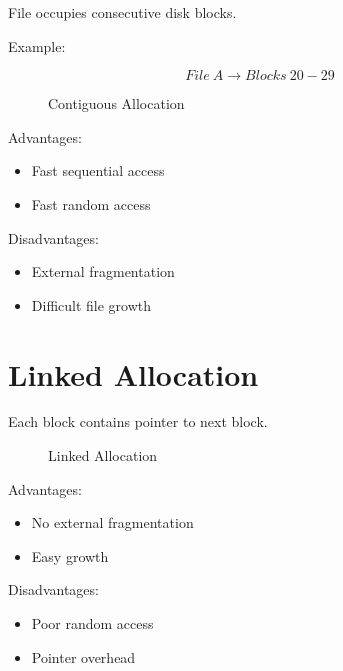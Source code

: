 File occupies consecutive disk blocks.

Example:

\[
File\ A \rightarrow Blocks\ 20-29
\]

\begin{figure}[H]
\centering
{}
\caption{Contiguous Allocation}
\end{figure}

Advantages:

\begin{itemize}
\item Fast sequential access
\item Fast random access
\end{itemize}

Disadvantages:

\begin{itemize}
\item External fragmentation
\item Difficult file growth
\end{itemize}

\section{Linked Allocation}

Each block contains pointer to next block.

\begin{figure}[H]
\centering
{}
\caption{Linked Allocation}
\end{figure}

Advantages:

\begin{itemize}
\item No external fragmentation
\item Easy growth
\end{itemize}

Disadvantages:

\begin{itemize}
\item Poor random access
\item Pointer overhead
\end{itemize}

